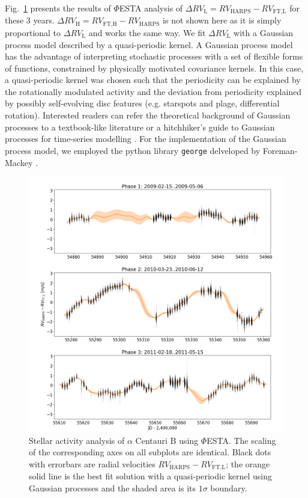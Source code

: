Fig.~\ref{fig:Alpha_Cen_B} presents the results of $\mathit{\Phi}$ESTA analysis of $\Delta RV_\text{L} = RV_\text{HARPS} - RV_\text{FT,L}$ for these 3 years. $\Delta RV_\text{H} = RV_\text{FT,H} - RV_\text{HARPS}$ is not shown here as it is simply proportional to $\Delta RV_\text{L}$ and works the same way. We fit $\Delta RV_\text{L}$ with a Gaussian process model described by a quasi-periodic kernel. A Gaussian process model has the advantage of interpreting stochastic processes with a set of flexible forms of functions, constrained by physically motivated covariance kernels. In this case, a quasi-periodic kernel was chosen such that the periodicity can be explained by the rotationally modulated activity and the deviation from periodicity explained by possibly self-evolving disc features (e.g. starspots and plage, differential rotation). Interested readers can refer the theoretical background of Gaussian processes to a textbook-like literature \cite{Rasmussen2006} or a hitchhiker's guide to Gaussian processes for time-series modelling \cite{Roberts_gaussianprocesses}. For the implementation of the Gaussian process model, we employed the python library \verb|george| delveloped by Foreman-Mackey \cite{Ambikasaran2014}. 

\begin{figure}[tbp]
\centering
\includegraphics[width = 1.0 \linewidth]
{./Figures/Methods/Alpha_Cen_B.png}
\caption[$\alpha$ Centauri B: stellar activity analysis]
		{Stellar activity analysis of $\alpha$ Centauri B using $\mathit{\Phi}$ESTA. The scaling of the corresponding axes on all subplots are identical. Black dots with errorbars are radial velocities $RV_\text{HARPS} - RV_\text{FT,L}$; the orange solid line is the best fit solution with a quasi-periodic kernel using Gaussian processes and the shaded area is its $1\sigma$ boundary.}
\label{fig:Alpha_Cen_B}
\end{figure} 

